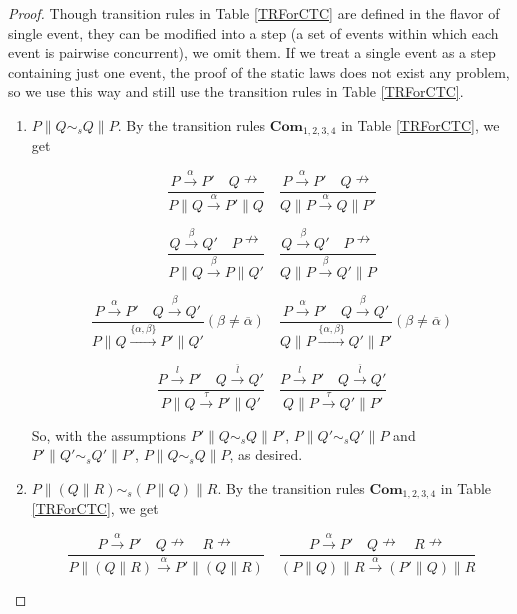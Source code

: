\begin{proof}
Though transition rules in Table \ref{TRForCTC} are defined in the flavor of single event, they can be modified into a step (a set of events within which each event is pairwise concurrent), we omit them. If we treat a single event as a step containing just one event, the proof of the static laws does not exist any problem, so we use this way and still use the transition rules in Table \ref{TRForCTC}.

\begin{enumerate}
  \item $P\parallel Q\sim_s Q\parallel P$. By the transition rules $\textbf{Com}_{1,2,3,4}$ in Table \ref{TRForCTC}, we get

      $$\frac{P\xrightarrow{\alpha}P'\quad Q\nrightarrow}{P\parallel Q\xrightarrow{\alpha}P'\parallel Q}
      \quad\frac{P\xrightarrow{\alpha}P'\quad Q\nrightarrow}{Q\parallel P\xrightarrow{\alpha}Q\parallel P'}$$

      $$\frac{Q\xrightarrow{\beta}Q'\quad P\nrightarrow}{P\parallel Q\xrightarrow{\beta}P\parallel Q'}
      \quad\frac{Q\xrightarrow{\beta}Q'\quad P\nrightarrow}{Q\parallel P\xrightarrow{\beta}Q'\parallel P}$$

      $$\frac{P\xrightarrow{\alpha}P'\quad Q\xrightarrow{\beta}Q'}{P\parallel Q\xrightarrow{\{\alpha,\beta\}}P'\parallel Q'}(\beta\neq\overline{\alpha})
      \quad\frac{P\xrightarrow{\alpha}P'\quad Q\xrightarrow{\beta}Q'}{Q\parallel P\xrightarrow{\{\alpha,\beta\}}Q'\parallel P'}(\beta\neq\overline{\alpha})$$

      $$\frac{P\xrightarrow{l}P'\quad Q\xrightarrow{\overline{l}}Q'}{P\parallel Q\xrightarrow{\tau}P'\parallel Q'}
      \quad\frac{P\xrightarrow{l}P'\quad Q\xrightarrow{\overline{l}}Q'}{Q\parallel P\xrightarrow{\tau}Q'\parallel P'}$$

      So, with the assumptions $P'\parallel Q \sim_s Q\parallel P'$, $P\parallel Q' \sim_s Q'\parallel P$ and $P'\parallel Q' \sim_s Q'\parallel P'$, $P\parallel Q\sim_s Q\parallel P$, as desired.
  \item $P\parallel(Q\parallel R)\sim_s (P\parallel Q)\parallel R$. By the transition rules $\textbf{Com}_{1,2,3,4}$ in Table \ref{TRForCTC}, we get

      $$\frac{P\xrightarrow{\alpha}P'\quad Q\nrightarrow\quad R\nrightarrow}{P\parallel (Q\parallel R)\xrightarrow{\alpha}P'\parallel (Q\parallel R)}
      \quad\frac{P\xrightarrow{\alpha}P'\quad Q\nrightarrow\quad R\nrightarrow}{(P\parallel Q)\parallel R\xrightarrow{\alpha}(P'\parallel Q)\parallel R}$$


\end{enumerate}
\end{proof}

